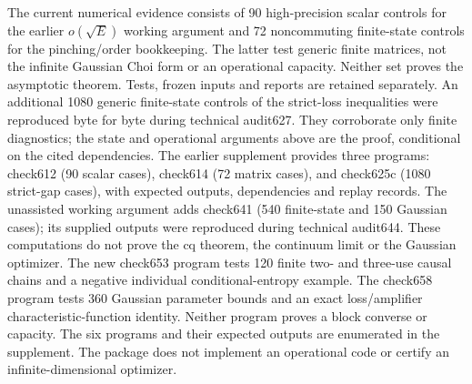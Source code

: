 \documentclass[11pt]{article}
\begin{document}
The current numerical evidence consists of 90 high-precision scalar
controls for the earlier \(o(\sqrt E)\) working argument and 72
noncommuting finite-state controls for the pinching/order bookkeeping.
The latter test generic finite matrices, not the infinite Gaussian Choi
form or an operational capacity. Neither set proves the asymptotic
theorem. Tests, frozen inputs and reports are retained separately.
An additional 1080 generic finite-state controls of the strict-loss
inequalities were reproduced byte for byte during technical audit627.
They corroborate only finite diagnostics; the state and operational
arguments above are the proof, conditional on the cited dependencies.
The earlier supplement provides three programs: check612 (90 scalar
cases), check614 (72 matrix cases), and check625c (1080 strict-gap
cases), with expected outputs, dependencies and replay records.
The unassisted working argument adds check641 (540 finite-state and
150 Gaussian cases); its supplied outputs were reproduced during
technical audit644. These computations do not prove the cq theorem,
the continuum limit or the Gaussian optimizer.
The new check653 program tests 120 finite two- and three-use causal
chains and a negative individual conditional-entropy example.
The check658 program tests 360 Gaussian parameter bounds and an exact
loss/amplifier characteristic-function identity.
Neither program proves a block converse or capacity. The six programs
and their expected outputs are enumerated in the supplement.
The package does not implement an operational code or certify an
infinite-dimensional optimizer.

\appendix
\end{document}
